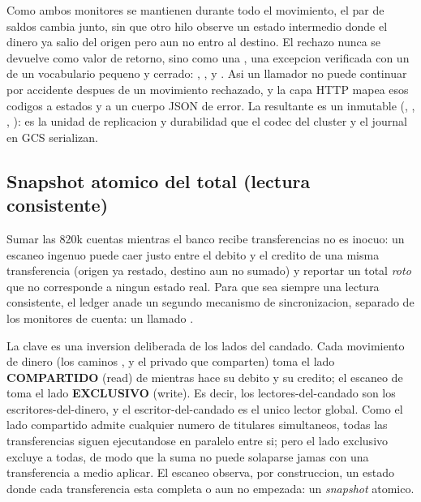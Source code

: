 Como ambos monitores se mantienen durante todo el movimiento, el par de saldos
cambia junto, sin que otro hilo observe un estado intermedio donde el dinero ya
salio del origen pero aun no entro al destino. El rechazo nunca se devuelve como
valor de retorno, sino como una , una
excepcion verificada con un  de un vocabulario pequeno y cerrado:
, ,  y
. Asi un llamador no puede continuar por accidente despues
de un movimiento rechazado, y la capa HTTP mapea esos codigos a estados y a un
cuerpo JSON de error. La  resultante es un
 inmutable (, , ,
): es la unidad de replicacion y durabilidad que el codec del
cluster y el journal en GCS serializan.

\subsection{Snapshot atomico del total (lectura consistente)}

Sumar las 820k cuentas mientras el banco recibe transferencias no es inocuo: un
escaneo ingenuo puede caer justo entre el debito y el credito de una misma
transferencia (origen ya restado, destino aun no sumado) y reportar un total
\emph{roto} que no corresponde a ningun estado real. Para que
 sea siempre una lectura consistente, el ledger anade
un segundo mecanismo de sincronizacion, separado de los monitores de cuenta: un
 llamado .

La clave es una inversion deliberada de los lados del candado. Cada movimiento de
dinero (los caminos ,  y el  privado
que comparten) toma el lado \textbf{COMPARTIDO} (read) de 
mientras hace su debito y su credito; el escaneo de  toma el
lado \textbf{EXCLUSIVO} (write). Es decir, los lectores-del-candado son los
escritores-del-dinero, y el escritor-del-candado es el unico lector global. Como
el lado compartido admite cualquier numero de titulares simultaneos, todas las
transferencias siguen ejecutandose en paralelo entre si; pero el lado exclusivo
excluye a todas, de modo que la suma no puede solaparse jamas con una
transferencia a medio aplicar. El escaneo observa, por construccion, un estado
donde cada transferencia esta completa o aun no empezada: un \emph{snapshot}
atomico.


